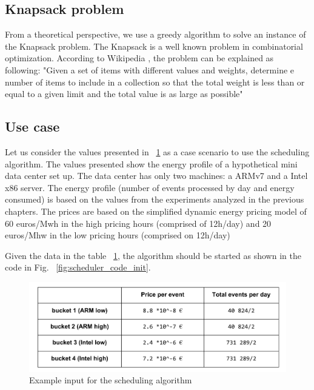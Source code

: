 \subsection*{Knapsack problem}
From a theoretical perspective, we use a greedy algorithm to solve an instance of the Knapsack problem. The Knapsack is a well known problem in combinatorial optimization. According to Wikipedia \cite{KNAPSACK_WIKI}, the problem can be explained as following: "Given a set of items with different values and weights, determine e number of items to include in a collection so that the total weight is less than or equal to a given limit and the total value is as large as possible"

\subsection*{Use case}

Let us consider the values presented in ~\ref{fig:input_table} as a case scenario to use the scheduling algorithm. The values presented show the energy profile of a hypothetical mini data center set up. The data center has only two machines: a ARMv7 and a Intel x86 server. The energy profile (number of events processed by day and energy consumed) is based on the values from the experiments analyzed in the previous chapters. The prices are based on the simplified dynamic energy pricing model of 60 euros/Mwh in the high pricing hours (comprised of 12h/day) and 20 euros/Mhw in the low pricing hours (comprised on 12h/day)

Given the data in the table ~\ref{fig:input_table}, the algorithm should be started as shown in the code in Fig. ~\ref{fig:scheduler_code_init}.

\begin{figure}[h]
  \centering
    \includegraphics[width=150mm]{"img/input_table"}
    \caption{Example input for the scheduling algorithm}
    \label{fig:input_table}
\end{figure}

